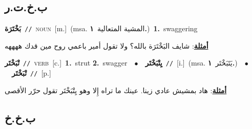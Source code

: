 \documentclass[10pt,a4paper,twoside]{article} %
\begin{document}
\begin{multicols}{2}
{{{{{{{{{{{{{{{{\vspace{-3mm}
\subsection*{\color{blue}\foreignlanguage{arabic}{ب.خ.ت.ر}\color{blue}{}} 

{\setlength\topsep{0pt}\textbf{\foreignlanguage{arabic}{بَخْتَرَة}}\ {\color{gray}\texttt{//}\color{black}}\ \textsc{noun}\ [m.]\ \color{gray}(msa. \foreignlanguage{arabic}{المشية المتعالية}~\foreignlanguage{arabic}{\textbf{١.}})\color{black}\ \textbf{1.}~swaggering\  \begin{flushright}\color{gray}\foreignlanguage{arabic}{\textbf{\underline{\foreignlanguage{arabic}{أمثلة}}}: شايف البَخْتَرَة بالله؟ ولا تقول أمير باعمي روح مين قدك ههههه}\end{flushright}\color{black}} \vspace{2mm}

{\setlength\topsep{0pt}\textbf{\foreignlanguage{arabic}{تْبَخْتَر}}\ {\color{gray}\texttt{//}\color{black}}\ \textsc{verb}\ [c.]\ \textbf{1.}~strut  \textbf{2.}~swagger\ \ $\bullet$\ \ \setlength\topsep{0pt}\textbf{\foreignlanguage{arabic}{يِتْبَخْتَر}}\ {\color{gray}\texttt{//}\color{black}}\ [i.]\ \color{gray}(msa. \foreignlanguage{arabic}{يَتَبَخْتَر}~\foreignlanguage{arabic}{\textbf{١.}})\color{black}\ \ $\bullet$\ \ \setlength\topsep{0pt}\textbf{\foreignlanguage{arabic}{تْبَخْتَر}}\ {\color{gray}\texttt{//}\color{black}}\ [p.]\  \begin{flushright}\color{gray}\foreignlanguage{arabic}{\textbf{\underline{\foreignlanguage{arabic}{أمثلة}}}: هاد بمشيش عادي زينا. عينك ما تراه إِلا وهو يِتْبَخْتَر تقول حرّر الأقصى}\end{flushright}\color{black}} \vspace{2mm}

\vspace{-3mm}
\subsection*{\color{blue}\foreignlanguage{arabic}{ب.خ.خ}\color{blue}{}} 

}}}}}}}}}}}}}}}}
\end{multicols}
\end{document}
